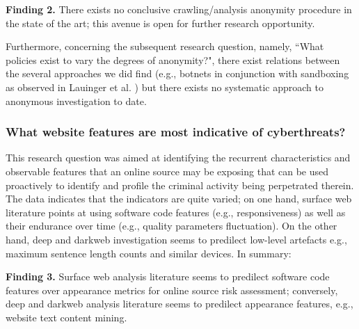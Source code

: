 \begin{framed}
\textbf{Finding 2.} There exists no conclusive crawling/analysis anonymity procedure in the state of the art; this avenue is open for further research opportunity.
\end{framed}

Furthermore, concerning the subsequent research question, namely, ``What policies exist to vary the degrees of anonymity?", there exist relations between the several approaches we did find (e.g., botnets in conjunction with sandboxing as observed in Lauinger et al. \cite{Lauinger2010HoneybotYM}) but there exists no systematic approach to anonymous investigation to date.

\subsubsection{What website features are most indicative of cyberthreats?}

This research question was aimed at identifying the recurrent characteristics and observable features that an online source may be exposing that can be used proactively to identify and profile the criminal activity being perpetrated therein. The data indicates that the indicators are quite varied; on one hand, surface web literature points at using software code features (e.g., responsiveness) as well as their endurance over time (e.g., quality parameters fluctuation). On the other hand, deep and darkweb investigation seems to predilect low-level artefacts e.g., maximum sentence length counts and similar devices. In summary:

\begin{framed}
\textbf{Finding 3.} Surface web analysis literature seems to predilect software code features over appearance metrics for online source risk assessment; conversely, deep and darkweb analysis literature seems to predilect appearance features, e.g., website text content mining.
\end{framed}

%
%

